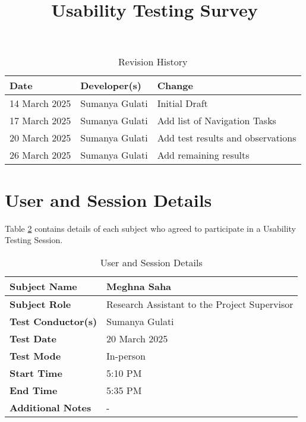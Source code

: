 \documentclass{article}
\title{Usability Testing Survey\\\progname}
\author{\authname}
\date{}
\begin{document}
\maketitle

\begin{table}[hp]
\caption{Revision History} \label{TblRevisionHistory}
\begin{tabularx}{\textwidth}{llX}
\toprule
\textbf{Date} & \textbf{Developer(s)} & \textbf{Change}\\
\midrule
14 March 2025 & Sumanya Gulati & Initial Draft\\
17 March 2025 & Sumanya Gulati & Add list of Navigation Tasks\\
20 March 2025 & Sumanya Gulati & Add test results and observations\\
26 March 2025 & Sumanya Gulati & Add remaining results\\
\bottomrule
\end{tabularx}
\end{table}

\newpage
\section{User and Session Details}
Table \ref{UserDetails} contains details of each subject who agreed to participate in a 
Usability Testing Session.
\begin{table}[hp]
\begin{tabularx}{\textwidth}{l | X}
\toprule
\textbf{Subject Name} & Meghna Saha \\
\midrule
\textbf{Subject Role} & Research Assistant to the Project Supervisor \\
\midrule
\textbf{Test Conductor(s)} & Sumanya Gulati \\
\midrule
\textbf{Test Date} & 20 March 2025 \\
\midrule
\textbf{Test Mode} & In-person \\
\midrule
\textbf{Start Time} & 5:10 PM \\
\midrule
\textbf{End Time} & 5:35 PM \\
\midrule
\textbf{Additional Notes} & - \\
\bottomrule
\end{tabularx}
\caption{User and Session Details} \label{UserDetails}
\end{table}
\end{document}
